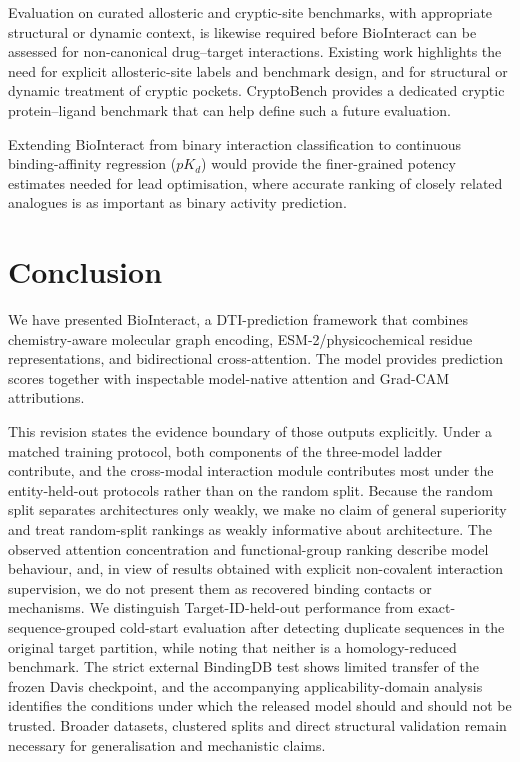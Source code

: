 \documentclass[fleqn,10pt]{wlscirep}
\begin{document}
Evaluation on curated allosteric and cryptic-site benchmarks, with appropriate
structural or dynamic context, is likewise required before BioInteract can be
assessed for non-canonical drug--target interactions.  Existing work highlights
the need for explicit allosteric-site labels and benchmark design,\cite{wu2022allostericbenchmark,gatlin2026allostericgrammar}
and for structural or dynamic treatment of cryptic pockets.\cite{zhang2026crypticpockets}
CryptoBench provides a dedicated cryptic protein--ligand benchmark that can help
define such a future evaluation.\cite{skrhak2024cryptobench}

Extending BioInteract from binary interaction classification to
continuous binding-affinity regression ($pK_d$) would provide the finer-grained
potency estimates needed for lead optimisation, where accurate ranking of closely
related analogues is as important as binary activity prediction.

\section{Conclusion}
\label{sec:conclusion}

We have presented BioInteract, a DTI-prediction framework that combines
chemistry-aware molecular graph encoding, ESM-2/physicochemical residue
representations, and bidirectional cross-attention.  The model provides
prediction scores together with inspectable model-native attention and Grad-CAM
attributions.

This revision states the evidence boundary of those outputs explicitly.  Under a
matched training protocol, both components of the three-model ladder contribute,
and the cross-modal interaction module contributes most under the
entity-held-out protocols rather than on the random split.  Because the random
split separates architectures only weakly, we make no claim of general
superiority and treat random-split rankings as weakly informative about
architecture.  The
observed attention concentration and functional-group ranking describe model
behaviour, and, in view of results obtained with explicit non-covalent
interaction supervision, we do not present them as recovered binding contacts or
mechanisms.  We distinguish Target-ID-held-out performance from
exact-sequence-grouped cold-start evaluation after detecting duplicate sequences
in the original target partition, while noting that neither is a
homology-reduced benchmark.  The strict external BindingDB test shows limited
transfer of the frozen Davis checkpoint, and the accompanying
applicability-domain analysis identifies the conditions under which the released
model should and should not be trusted.  Broader datasets, clustered splits and
direct structural validation remain necessary for generalisation and mechanistic
claims.
\end{document}
